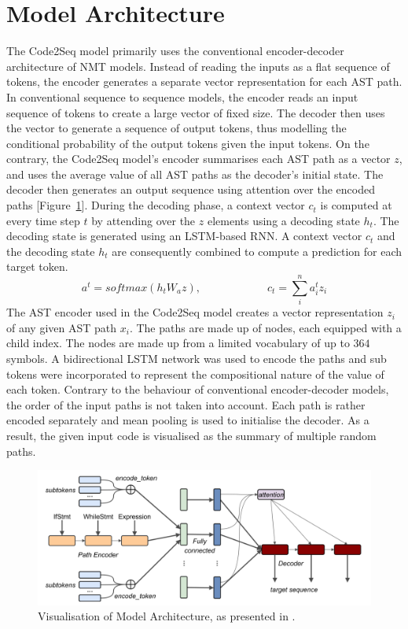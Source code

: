 \documentclass{article} %
\begin{document}
\section{Model Architecture} \label{sec:architecture}
The Code2Seq model primarily uses the conventional encoder-decoder architecture of NMT models. Instead of reading the inputs as a flat sequence of tokens, the encoder generates a separate vector representation for each AST path. In conventional sequence to sequence models, the encoder reads an input sequence of tokens to create a large vector of fixed size. The decoder then uses the vector to generate a sequence of output tokens, thus modelling the conditional probability of the output tokens given the input tokens. On the contrary, the Code2Seq model's encoder summarises each AST path as a vector $z$, and uses the average value of all AST paths as the decoder's initial state. The decoder then generates an output sequence using attention over the encoded paths [Figure~\ref{fig:modelarch}]. During the decoding phase, a context vector $c_t$ is computed at every time step $t$ by attending over the $z$ elements using a decoding state $h_t$. The decoding state is generated using an LSTM-based RNN. A context vector $c_t$ and the decoding state $h_t$ are consequently combined to compute a prediction for each target token.
$$a^t  = softmax(h_t W_a z),\quad\quad\quad\quad\quad\quad
  c_t  = \sum_{i}^{n} a_i^t z_i$$
The AST encoder used in the Code2Seq model creates a vector representation $z_i$ of any given AST path $x_i$. The paths are made up of nodes, each equipped with a child index. The nodes are made up from a limited vocabulary of up to $364$ symbols. A bidirectional LSTM network was used to encode the paths and sub tokens were incorporated to represent the compositional nature of the value of each token. Contrary to the behaviour of conventional encoder-decoder models, the order of the input paths is not taken into account. Each path is rather encoded separately and mean pooling is used to initialise the decoder. As a result, the given input code is visualised as the summary of multiple random paths.

\begin{figure}[hbt!]
	\centering
	\includegraphics[width=.9\textwidth]{imgs/architecture.png}
    \captionsetup{justification=centering}
	\caption{Visualisation of Model Architecture, as presented in \cite{alon2019}.}
	\label{fig:modelarch}
\end{figure}
\end{document}
